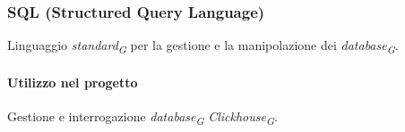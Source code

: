 \subsubsection{SQL (Structured Query Language)}
Linguaggio \textit{standard}\textsubscript{\textit{G}} per la gestione e la manipolazione dei
\textit{database}\textsubscript{\textit{G}}. 

\paragraph{Utilizzo nel progetto}
Gestione e interrogazione \textit{database}\textsubscript{\textit{G}} \textit{Clickhouse}\textsubscript{\textit{G}}.

